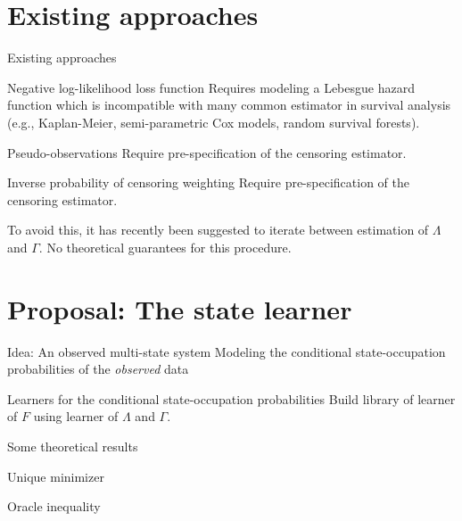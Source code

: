 \documentclass[smaller]{beamer}\usepackage{listings}
\begin{document}
\section{Existing approaches}
\label{sec:org6a03184}
\begin{frame}[label={sec:org405e76c}]{Existing approaches}
\begin{block}{Negative log-likelihood loss function}
Requires modeling a Lebesgue hazard function which is incompatible with many
common estimator in survival analysis (e.g., Kaplan-Meier, semi-parametric Cox
models, random survival forests).
\end{block}

\begin{block}{Pseudo-observations}
Require pre-specification of the censoring estimator.
\end{block}

\begin{block}{Inverse probability of censoring weighting}
Require pre-specification of the censoring estimator.

To avoid this, it has recently been suggested to iterate between estimation of
\(\Lambda\) and \(\Gamma\). No theoretical guarantees for this procedure.
\end{block}
\end{frame}


\section{Proposal: The state learner}
\label{sec:orgfd72fe9}
\begin{frame}[label={sec:orgfe13738}]{Idea: An observed multi-state system}
Modeling the conditional state-occupation probabilities of the \emph{observed} data
\end{frame}

\begin{frame}[label={sec:orgabc632c}]{Learners for the conditional state-occupation probabilities}
Build library of learner of \(F\) using learner of \(\Lambda\) and \(\Gamma\).
\end{frame}

\begin{frame}[label={sec:org06d07e2}]{Some theoretical results}
\begin{block}{Unique minimizer}
\end{block}

\begin{block}{Oracle inequality}
\end{block}
\end{frame}
\end{document}
